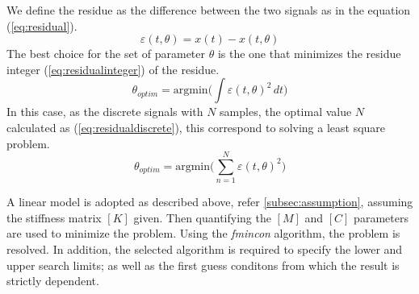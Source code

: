 %
We define the residue as the difference between the two signals as in the 
equation (\ref{eq:residual}).
\begin{equation}
\label{eq:residual}
	\varepsilon(t,\theta) = x(t) - x(t,\theta)
\end{equation} 
The best choice for the set of parameter $\theta$ is the one that minimizes the 
residue integer (\ref{eq:residualinteger}) of the residue. 
\begin{equation}
\label{eq:residualinteger}
	\theta_{optim} = \text{argmin} \biggl( \int \varepsilon(t,\theta)^2 \, dt \biggr)
\end{equation} 
In this case, as the discrete signals with $N$ samples, the optimal value $N$ 
calculated as (\ref{eq:residualdiscrete}), this correspond to solving a least 
square problem.
\begin{equation}
\label{eq:residualdiscrete} 
\theta_{optim} = \text{argmin} \Biggl( \sum_{n=1}^{N} \varepsilon(t,\theta)^2 \Biggr)
\end{equation}

A linear model is adopted as described above, refer \ref{subsec:assumption}, 
assuming the stiffness matrix $[K]$ given.
Then quantifying the $[M]$ and $[C]$ parameters are used to minimize the problem.
Using the \emph{fmincon} algorithm, the problem is resolved. In addition, the 
selected algorithm is required to specify the lower and upper search limits; 
as well as the first guess conditons from which the result is strictly dependent.

